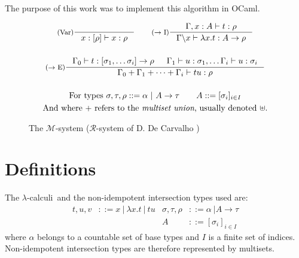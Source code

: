 \documentclass{article}
\newtheorem{Def}{Definition}
\def\lci{$\lambda$-calculi}
\begin{document}
The purpose of this work was to implement this algorithm in OCaml.

\begin{figure}[h]
    \begin{mdframed}
        \begin{gather*}
        \inference[(Var)]{}{x : [\rho] \vdash x : \rho}
        \qquad
        \inference[($\rightarrow$ I)]{\Gamma, x : A \vdash t : \rho}{\Gamma \backslash x \vdash \lambda x.t : A \rightarrow \rho}
        \\ \\
        \inference[($\rightarrow$ E)]{\Gamma_0 \vdash t : [\sigma_1, \ldots \sigma_i] \rightarrow \rho 
            & \Gamma_1 \vdash u : \sigma_1, \ldots \Gamma_i \vdash u : \sigma_i}
        {\Gamma_0 + \Gamma_1 + \cdots + \Gamma_i \vdash tu : \rho}
        \\ \\
        \text{For types } \sigma, \tau, \rho ::= \alpha \ | \ A \rightarrow \tau \qquad A ::= [\sigma_i]_{i \in I}
        \\ \text{And where $+$ refers to the \emph{multiset union}, usually denoted $\uplus$.}
        \end{gather*}
    \end{mdframed}
    \caption{The  $\mathcal{M}$-system ($\mathcal{R}$-system of D. De Carvalho \cite{DeCarvalho})}
    \label{SM}
\end{figure}


\section {Definitions}
The \lci\ and the non-idempotent intersection types used are:
\begin{align*}
	t, u, v &::= x\ |\ \lambda x.t\ |\ tu 
	& \sigma, \tau, \rho &::= \alpha \ | A \rightarrow \tau \\
	&& A &::= [\sigma_i]_{i \in I}
\end{align*}
where $\alpha$ belongs to a countable set of base types and $I$ is a finite set of indices. Non-idempotent intersection types are therefore represented by multisets.
\end{document}
